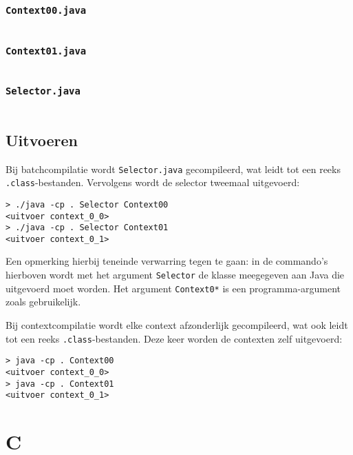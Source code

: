 \subsubsection{\texttt{Context00.java}}

\inputminted{java}{sources/echo/Context00.java}

\subsubsection{\texttt{Context01.java}}

\inputminted{java}{sources/echo/Context01.java}

\subsubsection{\texttt{Selector.java}}

\inputminted{java}{sources/echo/Selector.java}

\subsection{Uitvoeren}\label{subsec:echo-java-uitvoeren}

Bij batchcompilatie wordt \texttt{Selector.java} gecompileerd, wat leidt tot een reeks \texttt{.class}-bestanden.
Vervolgens wordt de selector tweemaal uitgevoerd:

\begin{verbatim}
> ./java -cp . Selector Context00
<uitvoer context_0_0>
> ./java -cp . Selector Context01
<uitvoer context_0_1>
\end{verbatim}

Een opmerking hierbij teneinde verwarring tegen te gaan: in de commando's hierboven wordt met het argument \texttt{Selector} de klasse meegegeven aan Java die uitgevoerd moet worden.
Het argument \texttt{Context0*} is een programma-argument zoals gebruikelijk.

Bij contextcompilatie wordt elke context afzonderlijk gecompileerd, wat ook leidt tot een reeks \texttt{.class}-bestanden.
Deze keer worden de contexten zelf uitgevoerd:

\begin{verbatim}
> java -cp . Context00
<uitvoer context_0_0>
> java -cp . Context01
<uitvoer context_0_1>
\end{verbatim}

\section{C}\label{sec:echo-c}

